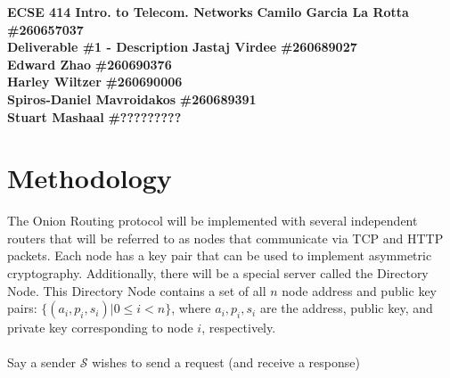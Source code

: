 \documentclass[10pt]{article}
\begin{document}
\noindent
\large \textbf{ECSE 414 Intro. to Telecom. Networks} \hfill \textbf{Camilo Garcia La Rotta} \textbf{\#260657037} \\
\large \textbf{Deliverable \#1 - Description} \hfill \textbf{Jastaj Virdee} \textbf{\#260689027} \\
\text{} \hfill \textbf{Edward Zhao} \textbf{\#260690376}\\
\text{} \hfill \textbf{Harley Wiltzer} \textbf{\#260690006}\\
\text{} \hfill \textbf{Spiros-Daniel Mavroidakos} \textbf{\#260689391}\\
\text{} \hfill \textbf{Stuart Mashaal} \textbf{\#?????????}\\

\section*{Methodology}
The Onion Routing protocol will be implemented with several independent routers
that will be referred to as nodes that communicate via TCP and HTTP packets.
Each node has a key pair that can be used to implement asymmetric cryptography.
Additionally, there will be a special server called the Directory Node. This
Directory Node contains a set of all $n$ node address and public key pairs: $\{(a_i,
p_i, s_i) | 0 \leq i < n\}$, where $a_i, p_i, s_i$ are the address, public key,
and private key corresponding to node $i$, respectively.\\\\
Say a sender $\mathcal{S}$ wishes to send a request (and receive a response)
\end{document}
